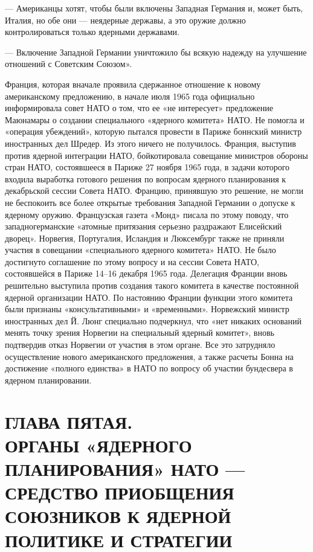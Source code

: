 \documentclass[12pt, a4paper, openany]{book}
\begin{document}
		— Американцы хотят, чтобы были включены Западная Германия и, может быть, Италия, но обе они — неядерные державы, а это оружие должно контролироваться только ядерными державами.
		
		— Включение Западной Германии уничтожило бы всякую надежду на улучшение отношений с Советским Союзом».
		
		Франция, которая вначале проявила сдержанное отношение к новому американскому предложению, в начале июля 1965 года официально информировала совет НАТО о том, что ее «не интересует» предложение Маюнамары о создании специального «ядерного комитета» НАТО. Не помогла и «операция убеждений», которую пытался провести в Париже боннский министр иностранных дел Шредер. Из этого ничего не получилось. Франция, выступив против ядерной интеграции НАТО, бойкотировала совещание министров обороны стран НАТО, состоявшееся в Париже 27 ноября 1965 года, в задачи которого входила выработка готового решения по вопросам ядерного планирования к декабрьской сессии Совета НАТО. Францию, принявшую это решение, не могли не беспокоить все более открытые требования Западной Германии о допуске к ядерному оружию. Французская газета «Монд» писала по этому поводу, что западногерманские «атомные притязания серьезно раздражают Елисейский дворец». Норвегия, Португалия, Исландия и Люксембург также не приняли участия в совещании «специального ядерного комитета» НАТО. Не было достигнуто соглашение по этому вопросу и на сессии Совета НАТО, состоявшейся в Париже 14–16 декабря 1965 года. Делегация Франции вновь решительно выступила против создания такого комитета в качестве постоянной ядерной организации НАТО. По настоянию Франции функции этого комитета были признаны «консультативными» и «временными». Норвежский министр иностранных дел Й. Люнг специально подчеркнул, что «нет никаких оснований менять точку зрения Норвегии на специальный ядерный комитет», вновь подтвердив отказ Норвегии от участия в этом органе. Все это затрудняло осуществление нового американского предложения, а также расчеты Бонна на достижение «полного единства» в НАТО по вопросу об участии бундесвера в ядерном планировании.
		
				\newpage
		\section[Глава пятая. ОРГАНЫ «ЯДЕРНОГО ПЛАНИРОВАНИЯ» НАТО — СРЕДСТВО ПРИОБЩЕНИЯ СОЮЗНИКОВ К ЯДЕРНОЙ ПОЛИТИКЕ И СТРАТЕГИИ]{\center ГЛАВА ПЯТАЯ.\\ \textbf{ОРГАНЫ «ЯДЕРНОГО ПЛАНИРОВАНИЯ» НАТО — СРЕДСТВО ПРИОБЩЕНИЯ СОЮЗНИКОВ К ЯДЕРНОЙ ПОЛИТИКЕ И СТРАТЕГИИ
		}}	
\end{document}
